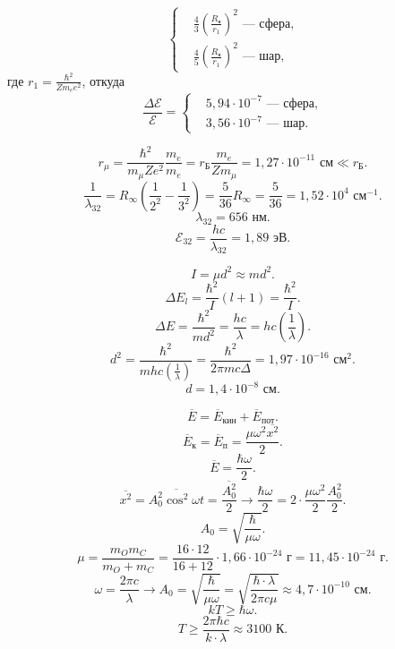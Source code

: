 \documentclass[a4paper]{article}
\begin{document}
\begin{sol}
\[	\left\{
	\begin{aligned}
		&\frac{4}{3} \left( \frac{R_\text{я}}{r_1} \right) ^2
		\text{ --- сфера,}\\
		&\frac{4}{5} \left( \frac{R_\text{я}}{r_1} \right) ^2
		\text{ --- шар,}
	\end{aligned}
	\right.
\] 
где $r_1=\frac{\hbar^2}{Z m_e e^2}$, откуда
\[
	 \frac{\Delta \mathcal{E}}{\mathcal{E}}=
	\left\{
	\begin{aligned}
		&5,94 \cdot 10^{-7}
		\text{ --- сфера,}\\
		&3,56 \cdot 10^{-7}
		\text{ --- шар.}
	\end{aligned}
	\right.
\] 

\end{sol}
\begin{sol}
\[
r_\mu= \frac{\hbar^2}{m_\mu Z e^2} \frac{m_e}{m_e}=r_\text{Б}
\frac{m_e}{Z m_\mu}= 1,27 \cdot 10^{-11} \text{ см} \ll r_{\text{Б}}
.\] 
\[
	\frac{1}{\lambda_{32}}= R_\infty \left( \frac{1}{2^2}-\frac{1}{3^2} \right) 
	= \frac{5}{36} R_\infty = \frac{5}{36}= 1,52 \cdot 10^4 \text{ см}^{-1}
.\] 
\[
\lambda_{32}= 656 \text{ нм}
.\] 
\[
	\mathcal{E}_{32}= \frac{hc}{\lambda_{32}}=1,89 \text{ эВ}
.\] 
\end{sol}
\begin{sol}
\[
I = \mu d^2 \approx m d^2
.\] 
\[
	\Delta E_l = \frac{\hbar^2}{I}(l+1)=\frac{\hbar^2}{I}
.\] 
\[
	\Delta E = \frac{\hbar^2}{m d^2}= \frac{hc}{\lambda}= hc \left( \frac{1}{\lambda} \right) 
.\] 
\[
	d^2 = \frac{\hbar^2}{m h c \left( \frac{1}{\lambda} \right) }=\frac{\hbar^2}{2 \pi m c \Delta}= 1,97 \cdot 10^{-16} \text{ см}^2
.\] 
\[
d= 1,4 \cdot 10^{-8 } \text{ см}
.\] 
\end{sol}
\begin{sol}
\[
\overline{E}= \overline{E}_\text{кин}+ \overline{E}_\text{пот}
.\] 
\[
\overline{E}_\text{к}= \overline{E}_\text{п}=
\frac{\mu \omega^2 \overline{x^2}}{2}
.\] 
\[
\overline{E}= \frac{\hbar \omega}{2}
.\] 
\[
\overline{x^2}= \overline{A_0^2 \cos^2 \omega t} =
\frac{\overline{A_0^2}}{2} \to  \frac{\hbar \omega}{2}=
2 \cdot \frac{\mu \omega^2}{2} \frac{A_0^2}{2}
.\]
\[
A_0= \sqrt{\frac{\hbar}{\mu \omega}} 
.\] 
\[
\mu= \frac{m_O m_C}{m_O+ m _C}= \frac{16\cdot 12}{16+12}\cdot
1,66 \cdot 10^{-24} \text{ г}= 11,45\cdot 10^{-24} \text{ г}
.\] 
\[
\omega= \frac{2 \pi c}{\lambda} \to  A_0= \sqrt{\frac{\hbar }{\mu
\omega}} = \sqrt{ \frac{\hbar \cdot \lambda}{2 \pi c \mu}} \approx
4,7 \cdot 10^{-10} \text{ см}
.\]
\[
kT \ge \hbar \omega
.\] 
\[
T\ge  \frac{2 \pi \hbar c}{k \cdot \lambda}\approx 3100 \text{ К}
.\] 
\end{sol}
\end{document}
